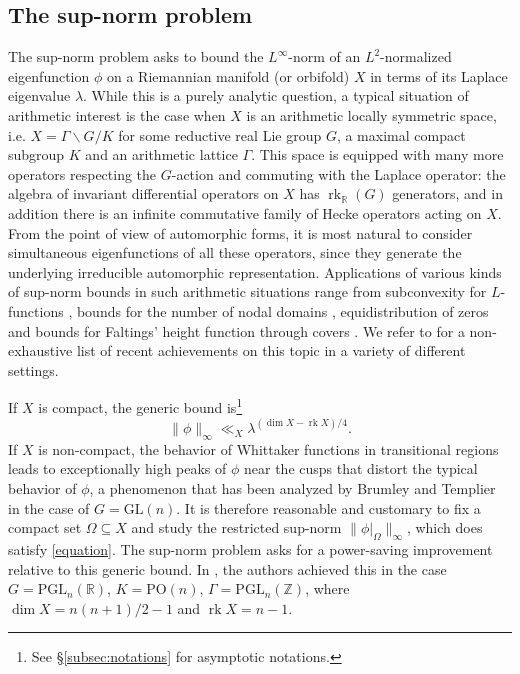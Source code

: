 \documentclass[11pt,oneside]{amsart}
\numberwithin{equation}{section}
\theoremstyle{remark}
\theoremstyle{plain}
\DeclareMathOperator{\rk}{rk}
\newcommand\GL{\mathrm{GL}}
\newcommand\PGL{\mathrm{PGL}}
\newcommand\PO{\mathrm{PO}}
\newcommand\ZZ{\mathbb{Z}}
\newcommand\RR{\mathbb{R}}
\newcommand\bs{\backslash}
\begin{document}
\subsection{The sup-norm problem}
The sup-norm problem asks to bound the $L^{\infty}$-norm of an $L^2$-normalized eigenfunction $\phi$ on a Riemannian manifold (or orbifold) $X$ in terms of its Laplace eigenvalue $\lambda$. While this is a purely analytic question, a typical situation of arithmetic interest is the case when $X$ is an arithmetic locally symmetric space, i.e. $X = \Gamma \bs G/K$ for some reductive real Lie group $G$, a maximal compact subgroup $K$ and an arithmetic lattice $\Gamma$. This space is equipped with many more operators respecting the $G$-action and commuting with the Laplace operator: the algebra of invariant differential operators on $X$ has $\rk_{\RR}(G)$ generators, and in addition there is an infinite commutative family of Hecke operators acting on $X$. From the point of view of automorphic forms, it is most natural to consider simultaneous eigenfunctions of all these operators, since they generate the underlying irreducible automorphic representation. Applications of various kinds of sup-norm bounds in such arithmetic situations range from subconvexity for $L$-functions \cite{IS}, bounds for the number of nodal domains \cite{GRS}, equidistribution of zeros \cite{Ru} and bounds for Faltings' height function through covers \cite{JK}. We refer to \cite{MR4046009, BHMM, MR4055171, MR4089374, MR4150475, MR4190047, MR4193473, MR4307129, MR4552668, AnambyDas2026, MR4683839, MR4728730, MR4735817, MR4731074, MR4886334, MR4752128, steiner2023thetafunctionsfourthmoments, MR4878397, MR5038903, MR5119486, assing2025orbitmethodnumbertheory} for a non-exhaustive list of recent achievements on this topic in a variety of different settings.

If $X$ is compact, the generic bound is\footnote{See \S\ref{subsec:notations} for asymptotic notations.}
\begin{equation}\label{equation}
\| \phi \|_{\infty} \ll_X \lambda^{(\dim X - \rk X)/4}.
\end{equation}
If $X$ is non-compact, the behavior of Whittaker functions in transitional regions leads to exceptionally high peaks of $\phi$ near the cusps that distort the typical behavior of $\phi$, a phenomenon that has been analyzed by Brumley and Templier~\cite{MR4150475} in the case of $G = \GL(n)$. It is therefore reasonable and customary to fix a compact set $\Omega \subseteq X$ and study the restricted sup-norm $\| \phi|_{\Omega} \|_{\infty}$, which does satisfy \eqref{equation}. The sup-norm problem asks for a power-saving improvement relative to this generic bound.
In \cite{BM}, the authors achieved this in the case $G = \PGL_n(\RR)$, $K = \PO(n)$, $\Gamma = \PGL_n(\ZZ)$, 
where $\dim X = n(n+1)/2 - 1$ and $\rk X = n-1$.
\end{document}
